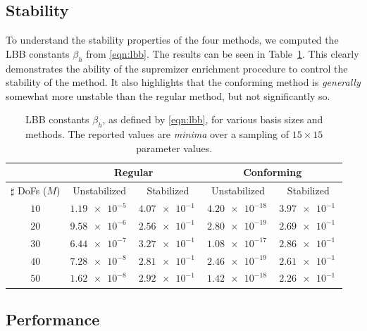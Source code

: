 \documentclass[onecolumn, twoside, a4paper, 11pt]{article}
\begin{document}
\subsection{Stability}

To understand the stability properties of the four methods, we computed the LBB
constants $\beta_h$ from \eqref{eqn:lbb}. The results can be seen in
Table~\ref{tbl:lbb}. This clearly demonstrates the ability of the supremizer
enrichment procedure to control the stability of the method. It also highlights
that the conforming method is \emph{generally} somewhat more unstable than the
regular method, but not significantly so.

\begin{table}
  \begin{center}
    \bgroup{}
    \begin{tabular}{crrrr}
      & \multicolumn{2}{c}{\bf Regular} & \multicolumn{2}{c}{\bf Conforming} \\
      \hline
      $\sharp$ DoFs ($M$) & \multicolumn{1}{c}{Unstabilized} & \multicolumn{1}{c}{Stabilized} & \multicolumn{1}{c}{Unstabilized} & \multicolumn{1}{c}{Stabilized} \\
      \hline $10$ & $\SI{1.19e-5}{}$ & $\SI{4.07e-1}{}$ & $\SI{4.20e-18}{}$ & $\SI{3.97e-1}{}$ \\
      $20$ & $\SI{9.58e-6}{}$ & $\SI{2.56e-1}{}$ & $\SI{2.80e-19}{}$ & $\SI{2.69e-1}{}$ \\
      $30$ & $\SI{6.44e-7}{}$ & $\SI{3.27e-1}{}$ & $\SI{1.08e-17}{}$ & $\SI{2.86e-1}{}$ \\
      $40$ & $\SI{7.28e-8}{}$ & $\SI{2.81e-1}{}$ & $\SI{2.46e-19}{}$ & $\SI{2.61e-1}{}$ \\
      $50$ & $\SI{1.62e-8}{}$ & $\SI{2.92e-1}{}$ & $\SI{1.42e-18}{}$ & $\SI{2.26e-1}{}$ \\
      \hline
    \end{tabular}
    \egroup
  \end{center}
  \caption{
    LBB constants $\beta_h$, as defined by \eqref{eqn:lbb}, for various basis
    sizes and methods. The reported values are \emph{minima} over a sampling of
    $15 \times 15$ parameter values.
  }
  \label{tbl:lbb}
\end{table}

\subsection{Performance}
\end{document}
